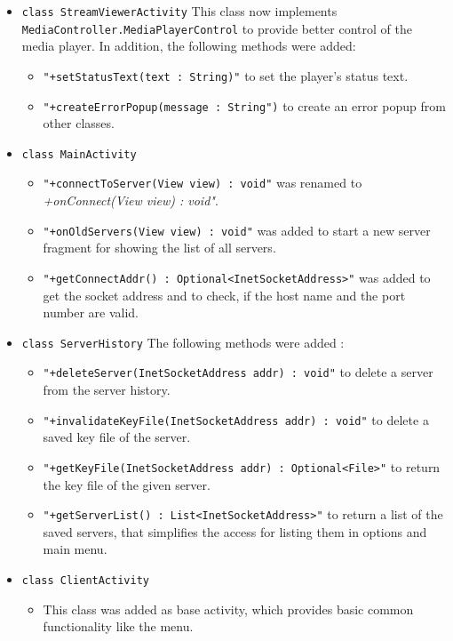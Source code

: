 \documentclass[a4paper,10pt]{scrartcl}
\begin{document}
\begin{itemize}
\item \lstinline|class StreamViewerActivity|
   This class now implements  \lstinline|MediaController.MediaPlayerControl| to provide better
  control of the media player. In addition, the following methods were added:
  \begin{itemize}
   \item \lstinline|"+setStatusText(text : String)"| to set the player's status text.
   \item \lstinline|"+createErrorPopup(message : String")| to create an error popup from other classes.
  \end{itemize}

   \item \lstinline|class MainActivity|
  \begin{itemize}
   \item \lstinline|"+connectToServer(View view) : void"| was renamed to \textit{+onConnect(View view) : void"}.
   \item \lstinline|"+onOldServers(View view) : void"| was added to start a new server fragment for showing the
    list of all servers.
    \item \lstinline|"+getConnectAddr() : Optional<InetSocketAddress>"| was added to get the socket address
    and to check, if the host name and the port number are valid.
  \end{itemize}

  \item \lstinline|class ServerHistory| \newline
  The following methods were added :
  \begin{itemize}
   \item \lstinline|"+deleteServer(InetSocketAddress addr) : void"| to delete a server from the server history.
   \item \lstinline|"+invalidateKeyFile(InetSocketAddress addr) : void"| to delete a saved key file of the server.
   \item \lstinline|"+getKeyFile(InetSocketAddress addr) : Optional<File>"| to return the key file of the given server.
   \item \lstinline|"+getServerList() : List<InetSocketAddress>"| to return a list of the saved servers, that simplifies the access for listing them in options and main menu.
  \end{itemize}

 \item \lstinline|class ClientActivity|
  \begin{itemize}
   \item This class was added as base activity, which provides basic common functionality like the menu.
  \end{itemize}


\end{itemize}
\end{document}
